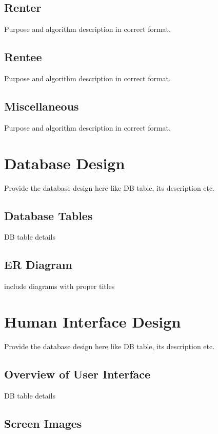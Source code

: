 \documentclass[11pt]{report}
\begin{document}
\subsection{Renter}
Purpose and algorithm description in correct format. %
\subsection{Rentee}
Purpose and algorithm description in correct format. %
\subsection{Miscellaneous}
Purpose and algorithm description in correct format. %


\section{Database Design}

Provide the database design here like DB table, its description etc.
\subsection{Database Tables}

DB table details

\subsection{ER Diagram}

include diagrams with proper titles

\section{Human Interface Design}

Provide the database design here like DB table, its description etc.
\subsection{Overview of User Interface}

DB table details

\subsection{Screen Images}
\end{document}
